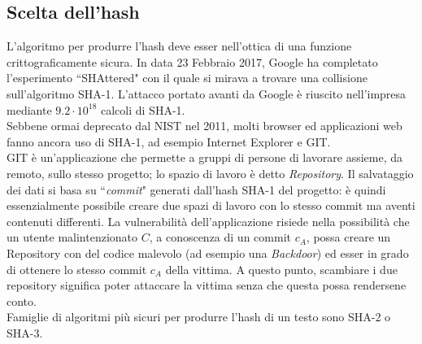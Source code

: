 \documentclass[a4paper,12pt]{tesiinfo}
\begin{document}
\subsection{Scelta dell'hash}
L'algoritmo per produrre l'hash deve esser nell'ottica di una funzione crittograficamente sicura. In data 23 Febbraio 2017, Google ha completato l'esperimento ``SHAttered" \cite{Shattered} con il quale si mirava a trovare una collisione sull'algoritmo SHA-1. L'attacco portato avanti da Google \`e riuscito nell'impresa mediante $9.2\cdot 10^{18}$ calcoli di SHA-1.
\\
Sebbene ormai deprecato dal NIST nel 2011, molti browser ed applicazioni web fanno ancora uso di SHA-1, ad esempio Internet Explorer e GIT.
\\
GIT \`e un'applicazione che permette a gruppi di persone di lavorare assieme, da remoto, sullo stesso progetto; lo spazio di lavoro \`e detto \textit{Repository}. Il salvataggio dei dati si basa su ``\textit{commit}" generati dall'hash SHA-1 del progetto: \`e quindi essenzialmente possibile creare due spazi di lavoro con lo stesso commit ma aventi contenuti differenti. La vulnerabilit\`a dell'applicazione risiede nella possibilit\`a che un utente malintenzionato $C$, a conoscenza di un commit $c_A$, possa creare un Repository con del codice malevolo (ad esempio una \textit{Backdoor}) ed esser in grado di ottenere lo stesso commit $c_A$ della vittima. A questo punto, scambiare i due repository significa poter attaccare la vittima senza che questa possa rendersene conto. 
\\
Famiglie di algoritmi pi\`u sicuri per produrre l'hash di un testo sono SHA-2 o SHA-3. 
%
%
%
%
%
%
%
%
%
%
%
%
%
\end{document}
